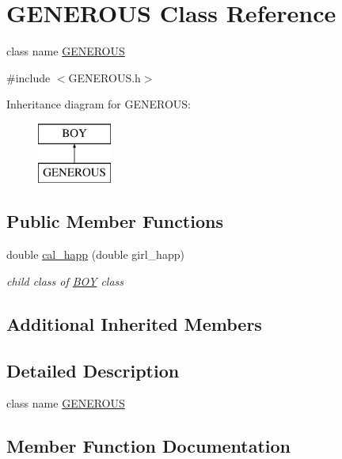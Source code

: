 \hypertarget{classGENEROUS}{}\section{G\+E\+N\+E\+R\+O\+US Class Reference}
\label{classGENEROUS}


class name \hyperlink{classGENEROUS}{G\+E\+N\+E\+R\+O\+US}  




{\ttfamily \#include $<$G\+E\+N\+E\+R\+O\+U\+S.\+h$>$}

Inheritance diagram for G\+E\+N\+E\+R\+O\+US\+:\begin{figure}[H]
\begin{center}
\leavevmode
\includegraphics[height=2.000000cm]{classGENEROUS}
\end{center}
\end{figure}
\subsection*{Public Member Functions}
\begin{DoxyCompactItemize}
\item 
double \hyperlink{classGENEROUS_afbeff7b10bbd75135cca3485cb50a537}{cal\+\_\+happ} (double girl\+\_\+happ)
\begin{DoxyCompactList}\small\item\em child class of \hyperlink{classBOY}{B\+OY} class \end{DoxyCompactList}\end{DoxyCompactItemize}
\subsection*{Additional Inherited Members}


\subsection{Detailed Description}
class name \hyperlink{classGENEROUS}{G\+E\+N\+E\+R\+O\+US} 

\subsection{Member Function Documentation}
\mbox{\label{classGENEROUS_afbeff7b10bbd75135cca3485cb50a537}} 

